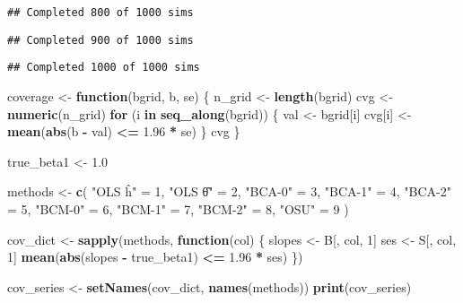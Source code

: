 \documentclass[
]{article}
\newenvironment{Shaded}{\begin{snugshade}}{\end{snugshade}}
\newcommand{\ControlFlowTok}[1]{\textcolor[rgb]{0.13,0.29,0.53}{\textbf{#1}}}
\newcommand{\DecValTok}[1]{\textcolor[rgb]{0.00,0.00,0.81}{#1}}
\newcommand{\FloatTok}[1]{\textcolor[rgb]{0.00,0.00,0.81}{#1}}
\newcommand{\FunctionTok}[1]{\textcolor[rgb]{0.13,0.29,0.53}{\textbf{#1}}}
\newcommand{\NormalTok}[1]{#1}
\newcommand{\OtherTok}[1]{\textcolor[rgb]{0.56,0.35,0.01}{#1}}
\newcommand{\SpecialCharTok}[1]{\textcolor[rgb]{0.81,0.36,0.00}{\textbf{#1}}}
\newcommand{\StringTok}[1]{\textcolor[rgb]{0.31,0.60,0.02}{#1}}
\begin{document}
\begin{verbatim}
## Completed 800 of 1000 sims
\end{verbatim}

\begin{verbatim}
## Completed 900 of 1000 sims
\end{verbatim}

\begin{verbatim}
## Completed 1000 of 1000 sims
\end{verbatim}

\begin{Shaded}
\begin{Highlighting}[]
\NormalTok{coverage }\OtherTok{\textless{}{-}} \ControlFlowTok{function}\NormalTok{(bgrid, b, se) \{}
\NormalTok{  n\_grid }\OtherTok{\textless{}{-}} \FunctionTok{length}\NormalTok{(bgrid)}
\NormalTok{  cvg    }\OtherTok{\textless{}{-}} \FunctionTok{numeric}\NormalTok{(n\_grid)}
  \ControlFlowTok{for}\NormalTok{ (i }\ControlFlowTok{in} \FunctionTok{seq\_along}\NormalTok{(bgrid)) \{}
\NormalTok{    val      }\OtherTok{\textless{}{-}}\NormalTok{ bgrid[i]}
\NormalTok{    cvg[i]   }\OtherTok{\textless{}{-}} \FunctionTok{mean}\NormalTok{(}\FunctionTok{abs}\NormalTok{(b }\SpecialCharTok{{-}}\NormalTok{ val) }\SpecialCharTok{\textless{}=} \FloatTok{1.96} \SpecialCharTok{*}\NormalTok{ se)}
\NormalTok{  \}}
\NormalTok{  cvg}
\NormalTok{\}}

\NormalTok{true\_beta1 }\OtherTok{\textless{}{-}} \FloatTok{1.0}

\NormalTok{methods }\OtherTok{\textless{}{-}} \FunctionTok{c}\NormalTok{(}
  \StringTok{"OLS ĥ"}  \OtherTok{=} \DecValTok{1}\NormalTok{,}
  \StringTok{"OLS θ̂"}  \OtherTok{=} \DecValTok{2}\NormalTok{,}
  \StringTok{"BCA{-}0"}  \OtherTok{=} \DecValTok{3}\NormalTok{,}
  \StringTok{"BCA{-}1"}  \OtherTok{=} \DecValTok{4}\NormalTok{,}
  \StringTok{"BCA{-}2"}  \OtherTok{=} \DecValTok{5}\NormalTok{,}
  \StringTok{"BCM{-}0"}  \OtherTok{=} \DecValTok{6}\NormalTok{,}
  \StringTok{"BCM{-}1"}  \OtherTok{=} \DecValTok{7}\NormalTok{,}
  \StringTok{"BCM{-}2"}  \OtherTok{=} \DecValTok{8}\NormalTok{,}
  \StringTok{"OSU"}    \OtherTok{=} \DecValTok{9}
\NormalTok{)}

\NormalTok{cov\_dict }\OtherTok{\textless{}{-}} \FunctionTok{sapply}\NormalTok{(methods, }\ControlFlowTok{function}\NormalTok{(col) \{}
\NormalTok{  slopes }\OtherTok{\textless{}{-}}\NormalTok{ B[, col, }\DecValTok{1}\NormalTok{]   }
\NormalTok{  ses    }\OtherTok{\textless{}{-}}\NormalTok{ S[, col, }\DecValTok{1}\NormalTok{]}
  \FunctionTok{mean}\NormalTok{(}\FunctionTok{abs}\NormalTok{(slopes }\SpecialCharTok{{-}}\NormalTok{ true\_beta1) }\SpecialCharTok{\textless{}=} \FloatTok{1.96} \SpecialCharTok{*}\NormalTok{ ses)}
\NormalTok{\})}

\NormalTok{cov\_series }\OtherTok{\textless{}{-}} \FunctionTok{setNames}\NormalTok{(cov\_dict, }\FunctionTok{names}\NormalTok{(methods))}
\FunctionTok{print}\NormalTok{(cov\_series)}
\end{Highlighting}
\end{Shaded}
\end{document}
